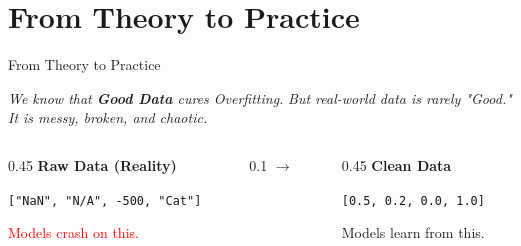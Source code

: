 \section{From Theory to Practice}
\begin{frame}{From Theory to Practice}

    \centering
    \large
    \textit{We know that \textbf{Good Data} cures Overfitting.}
    \vspace{0.5em}
    \textit{But real-world data is rarely "Good." It is messy, broken, and chaotic.}

    \vspace{1.5em}
    
    \begin{columns}[T]
        \begin{column}{0.45\textwidth}
            \centering
            \textbf{Raw Data (Reality)}
            \vspace{0.5em}
            \begin{tcolorbox}[colback=gray!10, boxrule=0pt]
                \centering \small
                \texttt{["NaN", "N/A", -500, "Cat"]}
            \end{tcolorbox}
            \small \textcolor{red}{Models crash on this.}
        \end{column}
        
        \begin{column}{0.1\textwidth}
            \centering \vspace{1cm} \Huge $\rightarrow$
        \end{column}
        
        \begin{column}{0.45\textwidth}
            \centering
            \textbf{Clean Data}
            \vspace{0.5em}
            \begin{tcolorbox}[colback=green!10, boxrule=0pt]
                \centering \small
                \texttt{[0.5, 0.2, 0.0, 1.0]}
            \end{tcolorbox}
            \small \textcolor{green!60!black}{Models learn from this.}
        \end{column}
    \end{columns}

\end{frame}

